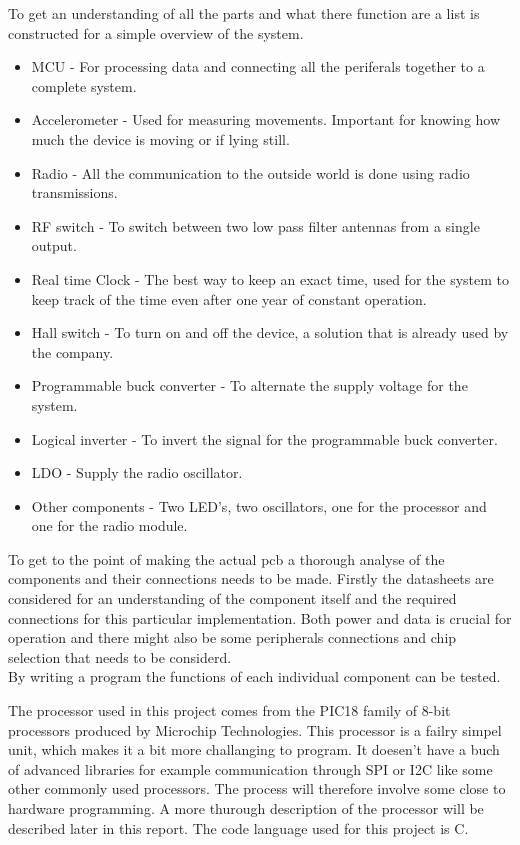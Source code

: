 To get an understanding of all the parts and what there function are a list is constructed for a simple overview of the system.

\begin{itemize}[noitemsep]
	\item MCU - For processing data and connecting all the periferals together to a complete system.
	\item Accelerometer - Used for measuring movements. Important for knowing how much the device is moving or if lying still.
	\item Radio - All the communication to the outside world is done using radio transmissions. 
	\item RF switch - To switch between two low pass filter antennas from a single output.
	\item Real time Clock - The best way to keep an exact time, used for the system to keep track of the time even after one year of constant operation. 
	\item Hall switch - To turn on and off the device, a solution that is already used by the company.
	\item Programmable buck converter - To alternate the supply voltage for the system. 
	\item Logical inverter - To invert the signal for the programmable buck converter.
	\item LDO - Supply the radio oscillator.
	\item Other components - Two LED's, two oscillators, one for the processor and one for the radio module.
\end{itemize}


To get to the point of making the actual \gls{pcb} a thorough analyse of the components and their connections needs to be made. Firstly the datasheets are considered for an understanding of the component itself and the required connections for this particular implementation. Both power and data is crucial for operation and there might also be some peripherals connections and chip selection that needs to be considerd. \\
By writing a program the functions of each individual component can be tested. 

The processor used in this project comes from the PIC18 family of 8-bit processors produced by Microchip Technologies. This processor is a failry simpel unit, which makes it a bit more challanging to program. It doesen't have a buch of advanced libraries for example communication through SPI or I2C like some other commonly used processors. The process will therefore involve some close to hardware programming. A more thurough description of the processor will be described later in this report. The code language used for this project is C.

